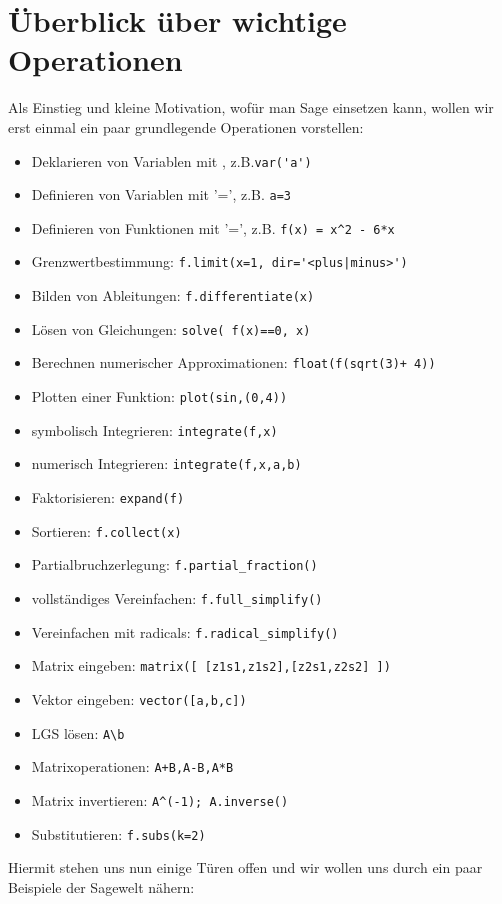 \documentclass[fontsize=12pt,paper=a4,twoside,bibtotoc,idxtotoc,
liststotoc,pagesize,BCOR1.2cm,DIV15,chapterprefix,pagesize=pdftex]{scrbook}
\theoremstyle{plain}
\theoremstyle{definition}
\theoremstyle{remark}
\begin{document}
\section{Überblick über wichtige Operationen}
Als Einstieg und kleine Motivation, wofür man Sage einsetzen kann, wollen wir erst einmal ein paar grundlegende Operationen 
vorstellen:
\begin{itemize}
 \item Deklarieren von Variablen mit , z.B.{\verb~var('a')~} 
 \item Definieren von Variablen mit {\color{blue}'='}, z.B. {\verb~a=3~} 
 \item Definieren von Funktionen mit{\color{blue} '='}, z.B. {\verb~f(x) = x^2 - 6*x~}
 \item Grenzwertbestimmung: {\color{blue}   \verb~f.limit(x=1, dir='<plus|minus>')~}
 \item Bilden von Ableitungen: {\color{blue} \verb~f.differentiate(x)~}
 \item Lösen von Gleichungen: {\color{blue} \verb~solve( f(x)==0, x)~}
 \item Berechnen numerischer Approximationen: {\color{blue} \verb~float(f(sqrt(3)+ 4))~}
 \item Plotten einer Funktion: {\color{blue} \verb~plot(sin,(0,4))~}
 \item symbolisch Integrieren: {\color{blue} \verb~integrate(f,x)~}
 \item numerisch Integrieren: {\color{blue} \verb~integrate(f,x,a,b)~}
 \item Faktorisieren: {\color{blue} \verb~expand(f)~}
 \item Sortieren: {\color{blue} \verb~f.collect(x)~}
 \item Partialbruchzerlegung: {\color{blue} \verb~f.partial_fraction()~}
 \item vollständiges Vereinfachen: {\color{blue} \verb~f.full_simplify()~}
 \item Vereinfachen mit radicals: {\color{blue} \verb~f.radical_simplify()~}
 \item Matrix eingeben: {\color{blue} \verb~matrix([ [z1s1,z1s2],[z2s1,z2s2] ])~}
 \item Vektor eingeben: {\color{blue} \verb~vector([a,b,c])~}
 \item LGS lösen: {\color{blue} \verb~A\b~}
 \item Matrixoperationen: {\color{blue} \verb~A+B,A-B,A*B~}
 \item Matrix invertieren: {\color{blue} \verb~A^(-1); A.inverse()~}
 \item Substitutieren: {\color{blue} \verb~f.subs(k=2)~}
\end{itemize}
Hiermit stehen uns nun einige Türen offen und wir wollen uns durch ein paar Beispiele der Sagewelt nähern:
\end{document}
